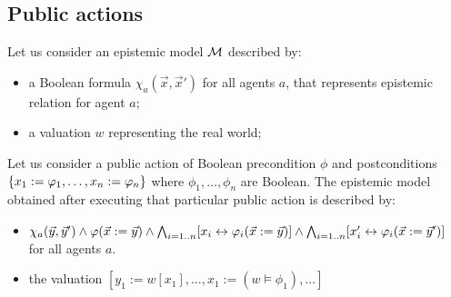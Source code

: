 \documentclass{article}
\begin{document}
\subsection{Public actions}

Let us consider an epistemic model $\mathcal M$ described by:
\begin{itemize}
	\item a Boolean formula $\chi_a(\vec x, \vec x')$ for all agents $a$, that represents epistemic relation for agent $a$;
	\item a valuation $w$ representing the real world;
\end{itemize}


Let us consider a public action of Boolean precondition $\phi$ and postconditions ${\{x_1 := \varphi_1, \dots, x_n := \varphi_n\}}$ where $\phi_1, \dots, \phi_n$ are Boolean. The epistemic model obtained after executing that particular public action is described by:
\begin{itemize}
	\item $\chi_a(\vec y, \vec y')  \land \varphi(\vec x := \vec y) \land \bigwedge_{i=1..n} [x_i \leftrightarrow \varphi_i(\vec x := \vec y)] \land \bigwedge_{i=1..n} [x_i' \leftrightarrow \varphi_i(\vec x := \vec y')]$ for all agents $a$.
	\item the valuation $[y_1 := w[x_1], \dots, x_1 := (w \models \phi_1), \dots]$
\end{itemize}










%
%
\end{document}
